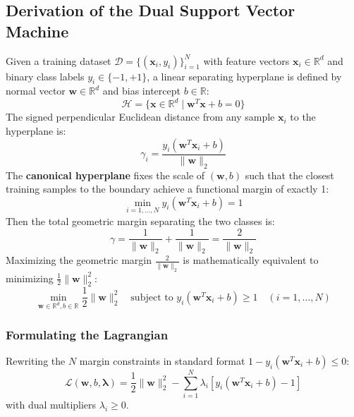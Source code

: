 \subsection{Derivation of the Dual Support Vector Machine}
Given a training dataset $\mathcal{D} = \{(\mathbf{x}_i, y_i)\}_{i=1}^N$ with feature vectors $\mathbf{x}_i \in \mathbb{R}^d$ and binary class labels $y_i \in \{-1, +1\}$, a linear separating hyperplane is defined by normal vector $\mathbf{w} \in \mathbb{R}^d$ and bias intercept $b \in \mathbb{R}$:
\begin{equation}
\mathcal{H} = \{\mathbf{x} \in \mathbb{R}^d \mid \mathbf{w}^T \mathbf{x} + b = 0\}
\end{equation}
The signed perpendicular Euclidean distance from any sample $\mathbf{x}_i$ to the hyperplane is:
\begin{equation}
\gamma_i = \frac{y_i (\mathbf{w}^T \mathbf{x}_i + b)}{\|\mathbf{w}\|_2}
\end{equation}
The \textbf{canonical hyperplane} fixes the scale of $(\mathbf{w}, b)$ such that the closest training samples to the boundary achieve a functional margin of exactly 1:
\begin{equation}
\min_{i=1,\dots,N} y_i (\mathbf{w}^T \mathbf{x}_i + b) = 1
\end{equation}
Then the total geometric margin separating the two classes is:
\begin{equation}
\gamma = \frac{1}{\|\mathbf{w}\|_2} + \frac{1}{\|\mathbf{w}\|_2} = \frac{2}{\|\mathbf{w}\|_2}
\end{equation}
Maximizing the geometric margin $\frac{2}{\|\mathbf{w}\|_2}$ is mathematically equivalent to minimizing $\frac{1}{2}\|\mathbf{w}\|_2^2$:
\begin{equation}
\min_{\mathbf{w} \in \mathbb{R}^d, b \in \mathbb{R}} \frac{1}{2} \|\mathbf{w}\|_2^2 \quad \text{subject to } y_i (\mathbf{w}^T \mathbf{x}_i + b) \ge 1 \quad (i = 1, \dots, N)
\label{eq:hard_svm_primal}
\end{equation}

\subsubsection{Formulating the Lagrangian}
Rewriting the $N$ margin constraints in standard format $1 - y_i(\mathbf{w}^T \mathbf{x}_i + b) \le 0$:
\begin{equation}
\mathcal{L}(\mathbf{w}, b, \boldsymbol{\lambda}) = \frac{1}{2}\|\mathbf{w}\|_2^2 - \sum_{i=1}^N \lambda_i \left[ y_i(\mathbf{w}^T \mathbf{x}_i + b) - 1 \right]
\label{eq:svm_lagrangian}
\end{equation}
with dual multipliers $\lambda_i \ge 0$.

